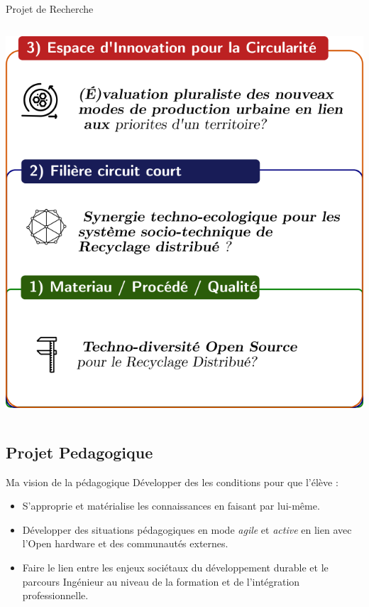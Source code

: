 \documentclass[
  11pt,
  ignorenonframetext,
  aspectratio=169,
  c]{beamer}
\begin{document}
\begin{frame}[t]{Projet de Recherche}
\begin{columns}[T]
\begin{column}{0.4\textwidth}
\includegraphics{Figures/slides/Projet-ERPI.png}
\end{column}
\end{columns}
\end{frame}

\hypertarget{projet-pedagogique}{%
\subsection{Projet Pedagogique}\label{projet-pedagogique}}

\begin{frame}{Ma vision de la pédagogique}
\protect\hypertarget{ma-vision-de-la-puxe9dagogique}{}
Développer des les conditions pour que l'élève :

\begin{itemize}
\item
  S'approprie et matérialise les connaissances en faisant par lui-même.
\item
  Développer des situations pédagogiques en mode \emph{agile} et
  \emph{active} en lien avec l'Open hardware et des communautés
  externes.
\item
  Faire le lien entre les enjeux sociétaux du développement durable et
  le parcours Ingénieur au niveau de la formation et de l'intégration
  professionnelle.
\end{itemize}
\end{frame}
\end{document}
